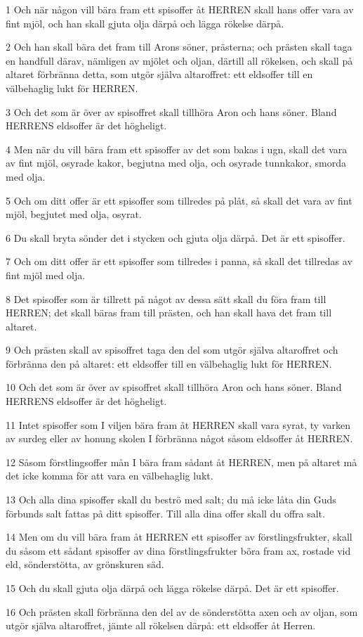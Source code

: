\par 1 Och när någon vill bära fram ett spisoffer åt HERREN skall hans offer vara av fint mjöl, och han skall gjuta olja därpå och lägga rökelse därpå.
\par 2 Och han skall bära det fram till Arons söner, prästerna; och prästen skall taga en handfull därav, nämligen av mjölet och oljan, därtill all rökelsen, och skall på altaret förbränna detta, som utgör själva altaroffret: ett eldsoffer till en välbehaglig lukt för HERREN.
\par 3 Och det som är över av spisoffret skall tillhöra Aron och hans söner. Bland HERRENS eldsoffer är det högheligt.
\par 4 Men när du vill bära fram ett spisoffer av det som bakas i ugn, skall det vara av fint mjöl, osyrade kakor, begjutna med olja, och osyrade tunnkakor, smorda med olja.
\par 5 Och om ditt offer är ett spisoffer som tillredes på plåt, så skall det vara av fint mjöl, begjutet med olja, osyrat.
\par 6 Du skall bryta sönder det i stycken och gjuta olja därpå. Det är ett spisoffer.
\par 7 Och om ditt offer är ett spisoffer som tillredes i panna, så skall det tillredas av fint mjöl med olja.
\par 8 Det spisoffer som är tillrett på något av dessa sätt skall du föra fram till HERREN; det skall bäras fram till prästen, och han skall hava det fram till altaret.
\par 9 Och prästen skall av spisoffret taga den del som utgör själva altaroffret och förbränna den på altaret: ett eldsoffer till en välbehaglig lukt för HERREN.
\par 10 Och det som är över av spisoffret skall tillhöra Aron och hans söner. Bland HERRENS eldsoffer är det högheligt.
\par 11 Intet spisoffer som I viljen bära fram åt HERREN skall vara syrat, ty varken av surdeg eller av honung skolen I förbränna något såsom eldsoffer åt HERREN.
\par 12 Såsom förstlingsoffer mån I bära fram sådant åt HERREN, men på altaret må det icke komma för att vara en välbehaglig lukt.
\par 13 Och alla dina spisoffer skall du beströ med salt; du må icke låta din Guds förbunds salt fattas på ditt spisoffer. Till alla dina offer skall du offra salt.
\par 14 Men om du vill bära fram åt HERREN ett spisoffer av förstlingsfrukter, skall du såsom ett sådant spisoffer av dina förstlingsfrukter böra fram ax, rostade vid eld, sönderstötta, av grönskuren säd.
\par 15 Och du skall gjuta olja därpå och lägga rökelse därpå. Det är ett spisoffer.
\par 16 Och prästen skall förbränna den del av de sönderstötta axen och av oljan, som utgör själva altaroffret, jämte all rökelsen därpå: ett eldsoffer åt Herren.

